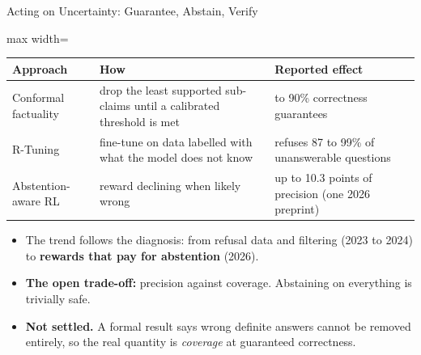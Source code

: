 \begin{frame}{Acting on Uncertainty: Guarantee, Abstain, Verify}
    \begin{center}
    \small
    \renewcommand{\arraystretch}{1.15}
    \begin{adjustbox}{max width=\linewidth}\begin{tabular}{>{\raggedright\arraybackslash}p{2.9cm}>{\raggedright\arraybackslash}p{5.3cm}>{\raggedright\arraybackslash}p{4.4cm}}
        \toprule
        \textbf{Approach} & \textbf{How} & \textbf{Reported effect} \\
        \midrule
        Conformal factuality & drop the least supported sub-claims until a calibrated threshold is met & 80 to 90\% correctness guarantees \\
        R-Tuning & fine-tune on data labelled with what the model does not know & refuses 87 to 99\% of unanswerable questions \\
        Abstention-aware RL & reward declining when likely wrong & up to 10.3 points of precision (one 2026 preprint) \\
        \bottomrule
    \end{tabular}\end{adjustbox}
    \end{center}
    \begin{itemize}\itemsep0.4em
        \item The trend follows the diagnosis: from refusal data and filtering (2023 to 2024) to \textbf{rewards that pay for abstention} (2026).
        \item \textbf{The open trade-off:} precision against coverage. Abstaining on everything is trivially safe.
        \item \textbf{Not settled.} A formal result says wrong definite answers cannot be removed entirely, so the real quantity is \emph{coverage} at guaranteed correctness.
    \end{itemize}
\end{frame}

